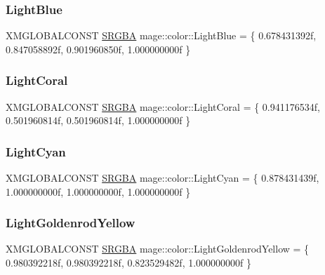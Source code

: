 \hypertarget{namespacemage_1_1color_ad873e37317c9f28a1133b46f15feba17}{}\label{namespacemage_1_1color_ad873e37317c9f28a1133b46f15feba17} 
\subsubsection{\texorpdfstring{Light\+Blue}{LightBlue}}
{\footnotesize\ttfamily X\+M\+G\+L\+O\+B\+A\+L\+C\+O\+N\+ST \hyperlink{structmage_1_1_s_r_g_b_a}{S\+R\+G\+BA} mage\+::color\+::\+Light\+Blue = \{ 0.\+678431392f, 0.\+847058892f, 0.\+901960850f, 1.\+000000000f \}}

\hypertarget{namespacemage_1_1color_a9e6cb84106511e85d1eebaf3ad65b743}{}\label{namespacemage_1_1color_a9e6cb84106511e85d1eebaf3ad65b743} 
\subsubsection{\texorpdfstring{Light\+Coral}{LightCoral}}
{\footnotesize\ttfamily X\+M\+G\+L\+O\+B\+A\+L\+C\+O\+N\+ST \hyperlink{structmage_1_1_s_r_g_b_a}{S\+R\+G\+BA} mage\+::color\+::\+Light\+Coral = \{ 0.\+941176534f, 0.\+501960814f, 0.\+501960814f, 1.\+000000000f \}}

\hypertarget{namespacemage_1_1color_ad0b871f45576f7616c34b17b7210b5ea}{}\label{namespacemage_1_1color_ad0b871f45576f7616c34b17b7210b5ea} 
\subsubsection{\texorpdfstring{Light\+Cyan}{LightCyan}}
{\footnotesize\ttfamily X\+M\+G\+L\+O\+B\+A\+L\+C\+O\+N\+ST \hyperlink{structmage_1_1_s_r_g_b_a}{S\+R\+G\+BA} mage\+::color\+::\+Light\+Cyan = \{ 0.\+878431439f, 1.\+000000000f, 1.\+000000000f, 1.\+000000000f \}}

\hypertarget{namespacemage_1_1color_a8b371a0d67368c8fa056de880b6fb418}{}\label{namespacemage_1_1color_a8b371a0d67368c8fa056de880b6fb418} 
\subsubsection{\texorpdfstring{Light\+Goldenrod\+Yellow}{LightGoldenrodYellow}}
{\footnotesize\ttfamily X\+M\+G\+L\+O\+B\+A\+L\+C\+O\+N\+ST \hyperlink{structmage_1_1_s_r_g_b_a}{S\+R\+G\+BA} mage\+::color\+::\+Light\+Goldenrod\+Yellow = \{ 0.\+980392218f, 0.\+980392218f, 0.\+823529482f, 1.\+000000000f \}}

